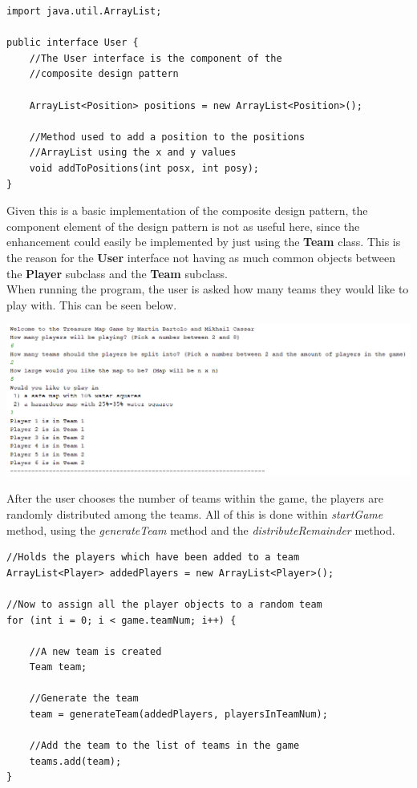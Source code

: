 \documentclass[a4paper,12pt]{extarticle}
\begin{document}
\begin{lstlisting}
import java.util.ArrayList;

public interface User {
    //The User interface is the component of the 
    //composite design pattern

    ArrayList<Position> positions = new ArrayList<Position>();

    //Method used to add a position to the positions 
    //ArrayList using the x and y values
    void addToPositions(int posx, int posy);
}
\end{lstlisting}
\vspace{4mm}

\noindent Given this is a basic implementation of the composite design pattern, the component element of the design pattern is not as useful here, since the enhancement could easily be implemented by just using the \textbf{Team} class. This is the reason for the \textbf{User} interface not having as much common objects between the \textbf{Player} subclass and the \textbf{Team} subclass.\\

\noindent When running the program, the user is asked how many teams they would like to play with. This can be seen below.

\begin{center}
\includegraphics[scale=0.5]{Team3.png}\\
\end{center}

\noindent After the user chooses the number of teams within the game, the players are randomly distributed among the teams. All of this is done within \textit{startGame} method, using the \textit{generateTeam} method and the \textit{distributeRemainder} method.\\
\vspace{4mm}

\newpage
\begin{lstlisting}
//Holds the players which have been added to a team
ArrayList<Player> addedPlayers = new ArrayList<Player>();

//Now to assign all the player objects to a random team
for (int i = 0; i < game.teamNum; i++) {

    //A new team is created
    Team team;

    //Generate the team
    team = generateTeam(addedPlayers, playersInTeamNum);

    //Add the team to the list of teams in the game
    teams.add(team);
}
\end{lstlisting}
\vspace{4mm}
\end{document}
